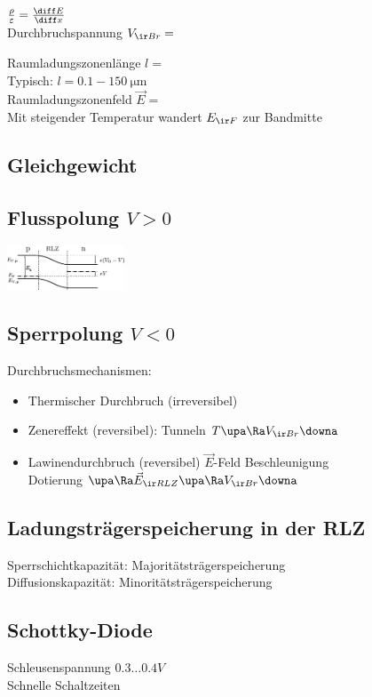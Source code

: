 \documentclass[fs, footer]{latex4ei}
\begin{document}
\begin{multicols*}{4}
{{$\frac{\rho}{\varepsilon} = \frac{\diff E}{\diff x}$\\
Durchbruchspannung $V_{\ir Br} = $


Raumladungszonenlänge $l = $\\
Typisch: $l = 0.1 - \SI{150}{\micro\meter}$\\
Raumladungszonenfeld $\vec E = $\\

Mit steigender Temperatur wandert $E_{\ir F}$ zur Bandmitte
}

\subsection{Gleichgewicht}


\subsection{Flusspolung $V > 0$}
\includegraphics[width = 3.5cm]{./img/pn_voltage.pdf}\\


\subsection{Sperrpolung $V < 0$}
Durchbruchsmechanismen:\\
\begin{itemize}
	\item Thermischer Durchbruch (irreversibel)
	\item Zenereffekt (reversibel): Tunneln $T \upa \Ra V_{\ir Br} \downa$
	\item Lawinendurchbruch (reversibel) $\vec E$-Feld Beschleunigung\\ Dotierung $\upa \Ra \vec E_{\ir RLZ} \upa \Ra V_{\ir Br} \downa$
\end{itemize}

\subsection{Ladungsträgerspeicherung in der RLZ}
Sperrschichtkapazität: Majoritätsträgerspeicherung\\
Diffusionskapazität: Minoritätsträgerspeicherung\\


\subsection{Schottky-Diode}
Schleusenspannung $0.3 \ldots 0.4 V$\\
Schnelle Schaltzeiten


}
\end{multicols*}
\end{document}
